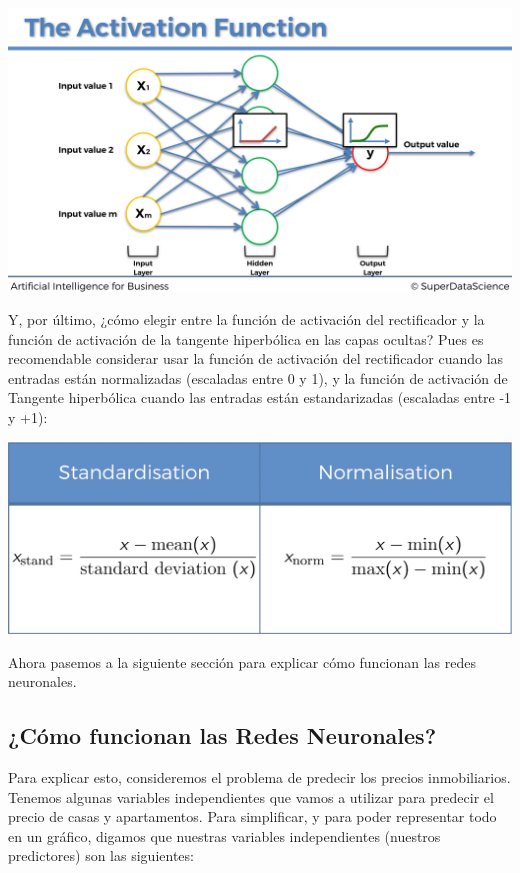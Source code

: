 \documentclass[
]{book}
\begin{document}
\includegraphics{Images/ANN_15.png}

Y, por último, ¿cómo elegir entre la función de activación del rectificador y la función de activación de la tangente hiperbólica en las capas ocultas? Pues es recomendable considerar usar la función de activación del rectificador cuando las entradas están normalizadas (escaladas entre 0 y 1), y la función de activación de Tangente hiperbólica cuando las entradas están estandarizadas (escaladas entre -1 y +1):

\includegraphics{Images/ANN_16.png}

Ahora pasemos a la siguiente sección para explicar cómo funcionan las redes neuronales.

\hypertarget{cuxf3mo-funcionan-las-redes-neuronales}{%
\subsection{¿Cómo funcionan las Redes Neuronales?}\label{cuxf3mo-funcionan-las-redes-neuronales}}

Para explicar esto, consideremos el problema de predecir los precios inmobiliarios. Tenemos algunas variables independientes que vamos a utilizar para predecir el precio de casas y apartamentos. Para simplificar, y para poder representar todo en un gráfico, digamos que nuestras variables independientes (nuestros predictores) son las siguientes:
\end{document}
